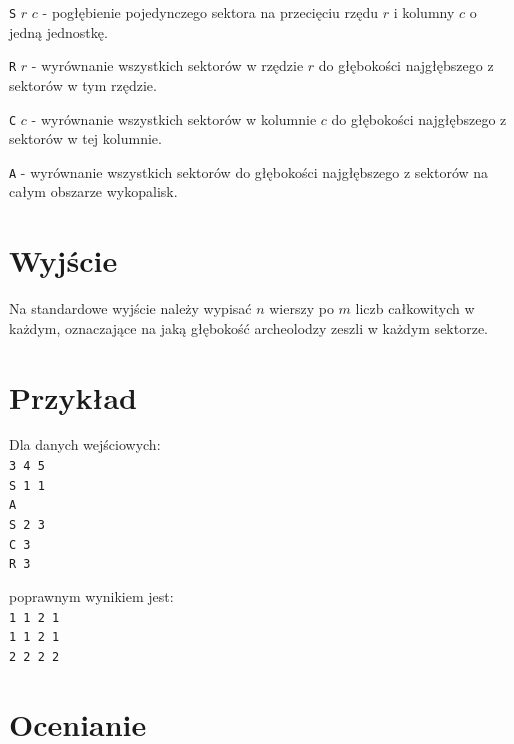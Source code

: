 \documentclass[10pt]{article}
\begin{document}
    \texttt{S} $r$ $c$ - pogłębienie pojedynczego sektora na przecięciu rzędu $r$ i kolumny $c$ o jedną jednostkę. 

    \texttt{R} $r$ - wyrównanie wszystkich sektorów w rzędzie $r$ do głębokości najgłębszego z sektorów w tym rzędzie. 

    \texttt{C} $c$ - wyrównanie wszystkich sektorów w kolumnie $c$ do głębokości najgłębszego z sektorów w tej kolumnie. 

    \texttt{A} - wyrównanie wszystkich sektorów do głębokości najgłębszego z sektorów na całym obszarze wykopalisk.


    \section*{Wyjście}
    
    Na standardowe wyjście należy wypisać $n$ wierszy po $m$ liczb całkowitych w każdym, oznaczające na jaką głębokość archeolodzy zeszli w każdym sektorze.


    \section*{Przykład}
    
    \noindent
    \begin{minipage}[t]{0.5\textwidth}
        Dla danych wejściowych:\vspace{1ex}\\
        \texttt{3 4 5\\S 1 1\\A\\S 2 3\\C 3\\R 3}
    \end{minipage}
    \begin{minipage}[t]{0.5\textwidth}
        poprawnym wynikiem jest:\vspace{1ex}\\
        \texttt{1 1 2 1\\1 1 2 1\\2 2 2 2}
    \end{minipage}
    

    \section*{Ocenianie}
        
\end{document}
